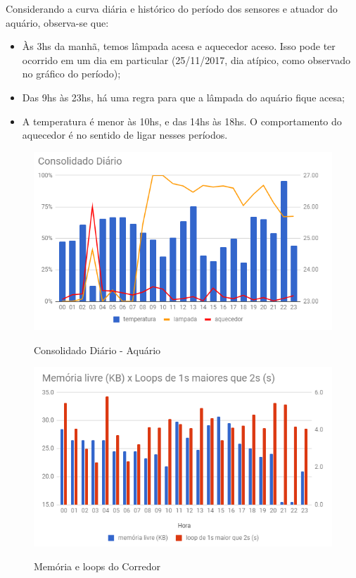Considerando a curva diária e histórico do período dos sensores e atuador do aquário, observa-se que:

\begin{itemize}
	\item Às 3hs da manhã, temos lâmpada acesa e aquecedor aceso. Isso pode ter ocorrido em um dia em particular (25/11/2017, dia atípico, como observado no gráfico do período);
	\item Das 9hs às 23hs, há uma regra para que a lâmpada do aquário fique acesa;
	\item A temperatura é menor às 10hs, e das 14hs às 18hs. O comportamento do aquecedor é no sentido de ligar nesses períodos.
	
\end{itemize}

\begin{figure}[H]
	\centering
	\caption{Consolidado Diário - Aquário}
	\includegraphics[width=1.0\textwidth]{AquaDia}
	\label{fig:AquaDia}
\end{figure}

\begin{figure}[H]
	\centering
	\caption{Memória e loops do Corredor}
	\includegraphics[width=1.0\textwidth]{MemLivreCorredor}
	\label{fig:MemLivreCorredor}
\end{figure}

